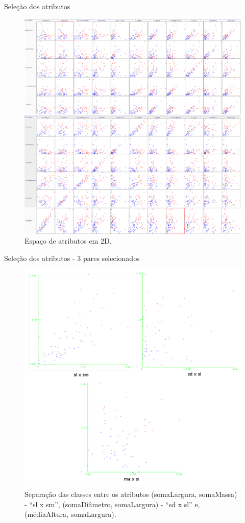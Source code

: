 \documentclass[brazil]{beamer}
\begin{document}
\begin{frame}{Seleção dos atributos}
\begin{figure}[!htb] \centering 
  \centering
  \includegraphics[width=0.7\columnwidth]{slide/all_plot} 
  \caption{Espaço de atributos em 2D.} 
  \label{fig:all_plot}
\end{figure}
\end{frame}

\begin{frame}{Seleção dos atributos - 3 pares selecionados}
\begin{figure}[!htb] \centering 
  \centering
  \includegraphics[width=0.7\columnwidth]{slide/eixos_4_atributos} 
  \caption{Separação das classes entre os atributos (somaLargura, somaMassa) - ``sl x sm'', (somaDiâmetro, somaLargura) - ``sd x sl'' e, (médiaAltura, somaLargura).} 
  \label{fig:eixos_4_atributos}
\end{figure}
\end{frame}
\end{document}
